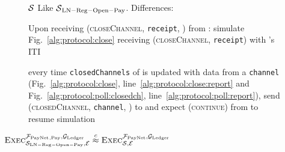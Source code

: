 \begin{figure}[H]
  \begin{simulatorbox}{$\mathcal{S}$}
    Like $\mathcal{S}{}_{\mathrm{LN - Reg - Open - Pay}}$. Differences:
    \begin{algorithmic}[1]
      \State Upon receiving (\textsc{closeChannel}, \texttt{receipt}, \alice)
      from \fpaynet:
      \Indent
        \State simulate Fig.~\ref{alg:protocol:close} receiving
        (\textsc{closeChannel}, \texttt{receipt}) with \alice's ITI
      \EndIndent
      \Statex

      \State every time \texttt{closedChannels} of \alice{} is updated with
      data from a \texttt{channel} (Fig.~\ref{alg:protocol:close},
      line~\ref{alg:protocol:close:report} and
      Fig.~\ref{alg:protocol:poll:closedch},
      line~\ref{alg:protocol:poll:report}), send (\textsc{closedChannel},
      \texttt{channel}, \alice) to \fpaynet{} and expect (\textsc{continue})
      from \fpaynet{} to resume simulation
      \label{alg:sim:close:report}
    \end{algorithmic}
  \end{simulatorbox}
  \caption{}
  \label{alg:sim:close}
\end{figure}

\begin{lemma}
  \label{lemma:close}
  $\textsc{Exec}^{\mathcal{F}_{\mathrm{PayNet}}{}_{\mathrm{, Pay}}, \mathcal{G}_{\mathrm{Ledger}}}_{\mathcal{S}_{\mathrm{LN
  - Reg - Open - Pay}}, \mathcal{E}} \overset{c}{\approx}
  \textsc{Exec}^{\mathcal{F}_{\mathrm{PayNet}}, \mathcal{G}_{\mathrm{Ledger}}}_{\mathcal{S}, \mathcal{E}}$
\end{lemma}

